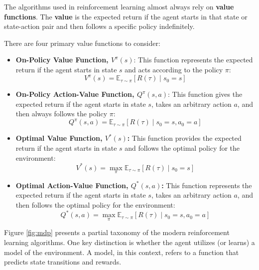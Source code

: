 The algorithms used in reinforcement learning almost always rely on
\textbf{value functions}.
The \textbf{value} is the expected return if the agent starts in
that state or state-action pair and then follows a specific policy indefinitely.

\vspace{5cm}

There are four primary value functions to consider:

\begin{itemize}
    \item \textbf{On-Policy Value Function, \( V^{\pi}(s) \)}: This function
    represents the expected return if the agent starts in state \( s \)
    and acts according to the policy \( \pi \):
    \begin{equation}
    V^{\pi}(s) = \mathbb{E}_{\tau \sim \pi} \left[ R(\tau) \mid s_0 = s \right]
    \end{equation}
    \item \textbf{On-Policy Action-Value Function, \( Q^{\pi}(s,a) \)}:
    This function gives the expected return if the agent starts in state \( s \),
    takes an arbitrary action \( a \), and then always follows the policy \( \pi \):
    \begin{equation}
    Q^{\pi}(s,a) = \mathbb{E}_{\tau \sim \pi} \left[ R(\tau) \mid s_0 = s, a_0 = a \right]
    \end{equation}
    \item \textbf{Optimal Value Function, \( V^*(s) \):} This function provides
    the expected return if the agent starts in state \( s \) and follows the
    optimal policy for the environment:
    \begin{equation}
    V^*(s) = \max_{\pi} \mathbb{E}_{\tau \sim \pi} \left[ R(\tau) \mid s_0 = s \right]
    \end{equation}
    \item \textbf{Optimal Action-Value Function, \( Q^*(s,a) \):} This function
    represents the expected return if the agent starts in state \( s \),
    takes an arbitrary action \( a \), and then follows the optimal policy for the environment:
    \begin{equation}
    Q^*(s,a) = \max_{\pi} \mathbb{E}_{\tau \sim \pi} \left[ R(\tau) \mid s_0 = s, a_0 = a \right]
    \end{equation}
\end{itemize}

Figure \ref{fig:mdp}
presents a partial taxonomy of the modern reinforcement learning algorithms.
One key distinction is whether the agent utilizes (or learns) a model of
the environment. A model, in this context, refers to a function that predicts
state transitions and rewards.

